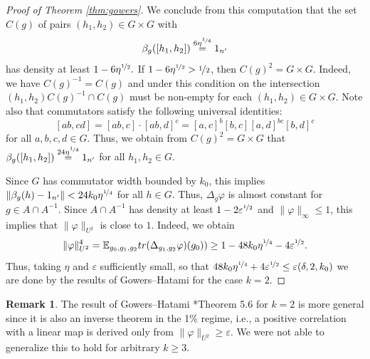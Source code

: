 \documentclass[a4paper,11pt]{amsproc}
\theoremstyle{plain}
\theoremstyle{definition}
\newtheorem{remark}[theorem]{Remark}
\begin{document}
\begin{proof}[Proof of Theorem \ref{thm:gowers}]
We conclude from this computation that the set $C(g)$ of pairs $(h_1,h_2) \in G\times G$ with $$\beta_g([h_1,h_2]) \stackrel{6\eta^{\nicefrac14}}{=} 1_{n'}$$ has density at least $1-6\eta^{\nicefrac12}.$ If $1-6\eta^{\nicefrac12}>\nicefrac12$, then $C(g)^2=G \times G.$ Indeed, we have $C(g)^{-1}= C(g)$ and under this condition on the intersection $(h_1,h_2)C(g)^{-1} \cap C(g)$ must be non-empty for each $(h_1,h_2) \in G \times G$. Note also that commutators satisfy the following universal identities:
$$[ab,cd]=[ab,c]\cdot [ab,d]^{c} = [a,c]^b[b,c][a,d]^{bc}[b,d]^c$$
for all $a,b,c,d \in G$. Thus, we obtain from $C(g)^2 = G \times G$ that 
$\beta_g([h_1,h_2]) \stackrel{24\eta^{\nicefrac14}}{=} 1_{n'}$
for all $h_1,h_2 \in G.$

Since $G$ has commutator width bounded by $k_0$, this implies $\|\beta_g(h) - 1_{n'}\| < 24k_0 \eta^{\nicefrac14}$ for all $h \in G.$
Thus, $\Delta_g \varphi$ is almost constant for $g \in A \cap A^{-1}$. Since $A \cap A^{-1}$ has density at least $1- 2\varepsilon^{\nicefrac12}$ and $\|\varphi\|_{\infty}\leq 1$, this implies that $\|\varphi\|_{U^2}$ is close to $1$. Indeed, we obtain
$$\|\varphi\|^4_{U^2} = \mathbb E_{g_0,g_1,g_2} {\rm tr}( \Delta_{g_1,g_2} \varphi)(g_0)) 
\geq 1 - 48k_0 \eta^{\nicefrac14} - 4\varepsilon^{\nicefrac12}.$$
Thus, taking $\eta$ and $\varepsilon$ sufficiently small, so that $48k_0 \eta^{\nicefrac14} + 4\varepsilon^{\nicefrac12} \leq \varepsilon(\delta,2,k_0)$  we are done by the results of Gowers--Hatami for the case $k=2$.
\end{proof}

\begin{remark}
The result of Gowers--Hatami \cite{MR3733361}*{Theorem 5.6} for $k=2$ is more general since it is also an inverse theorem in the 1\% regime, i.e., a positive correlation with a linear map is derived only from $\|\varphi\|_{U^2} \geq \varepsilon.$ We were not able to generalize this to hold for arbitrary $k \geq 3$.
\end{remark}

\appendix
\end{document}
